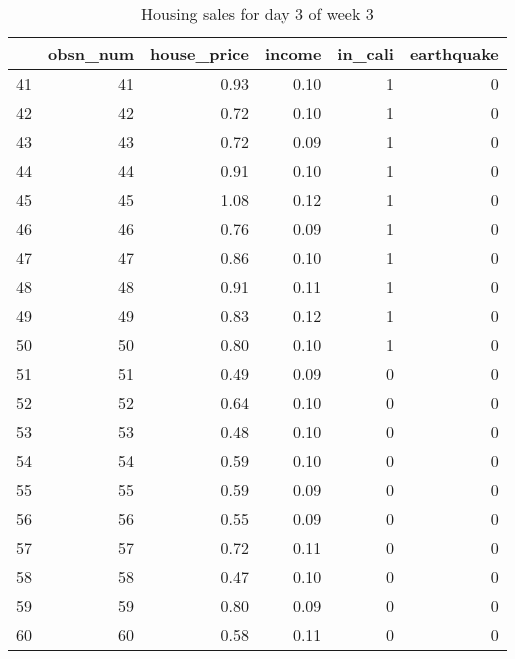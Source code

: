 \begin{table}[ht]
\centering
\begin{tabular}{rrrrrr}
  \hline
 & obsn\_num & house\_price & income & in\_cali & earthquake \\ 
  \hline
41 &  41 & 0.93 & 0.10 &   1 &   0 \\ 
  42 &  42 & 0.72 & 0.10 &   1 &   0 \\ 
  43 &  43 & 0.72 & 0.09 &   1 &   0 \\ 
  44 &  44 & 0.91 & 0.10 &   1 &   0 \\ 
  45 &  45 & 1.08 & 0.12 &   1 &   0 \\ 
  46 &  46 & 0.76 & 0.09 &   1 &   0 \\ 
  47 &  47 & 0.86 & 0.10 &   1 &   0 \\ 
  48 &  48 & 0.91 & 0.11 &   1 &   0 \\ 
  49 &  49 & 0.83 & 0.12 &   1 &   0 \\ 
  50 &  50 & 0.80 & 0.10 &   1 &   0 \\ 
  51 &  51 & 0.49 & 0.09 &   0 &   0 \\ 
  52 &  52 & 0.64 & 0.10 &   0 &   0 \\ 
  53 &  53 & 0.48 & 0.10 &   0 &   0 \\ 
  54 &  54 & 0.59 & 0.10 &   0 &   0 \\ 
  55 &  55 & 0.59 & 0.09 &   0 &   0 \\ 
  56 &  56 & 0.55 & 0.09 &   0 &   0 \\ 
  57 &  57 & 0.72 & 0.11 &   0 &   0 \\ 
  58 &  58 & 0.47 & 0.10 &   0 &   0 \\ 
  59 &  59 & 0.80 & 0.09 &   0 &   0 \\ 
  60 &  60 & 0.58 & 0.11 &   0 &   0 \\ 
   \hline
\end{tabular}
\caption{Housing sales for day 3 of week 3} 
\end{table}
